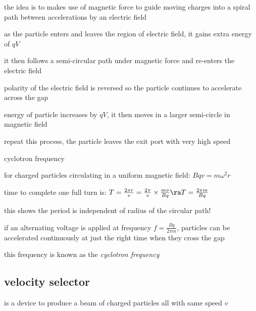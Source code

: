 the idea is to makes use of magnetic force to guide moving charges into a spiral path between accelerations by an electric field

as the particle enters and leaves the region of electric field, it gains extra energy of $qV$

it then follows a semi-circular path under magnetic force and re-enters the electric field

polarity of the electric field is reversed so the particle continues to accelerate across the gap

energy of particle increases by $qV$, it then moves in a larger semi-circle in magnetic field

repeat this process, the particle leaves the exit port with very high speed



\cmt cyclotron frequency

for charged particles circulating in a uniform magnetic field: $Bqv=m\omega^2 r$

time to complete one full turn is: $T=\frac{2\pi r}{v} = \frac{2\pi}{v}\times\frac{mv}{Bq}\ra T=\frac{2\pi m}{Bq}$

this shows the period is independent of radius of the circular path!

if an alternating voltage is applied at frequency $f=\frac{Bq}{2\pi m}$, particles can be accelerated continuously at just the right time when they cross the gap

this frequency is known as the \emph{cyclotron frequency}



\subsection{velocity selector}

 is a device to produce a beam of charged particles all with same speed $v$

